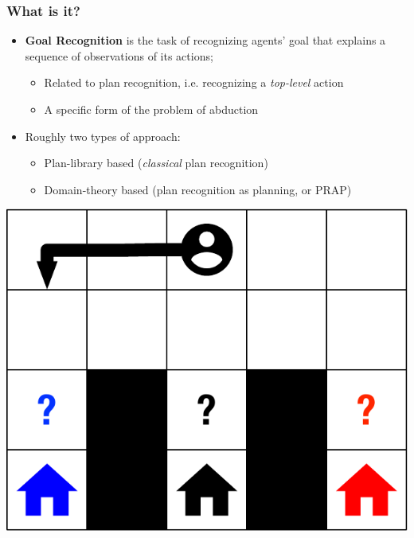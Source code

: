 \documentclass[usenames,dvipsnames]{beamer}
\begin{document}
	\begin{frame}[c]\frametitle{What is it?}
		\begin{itemize}
			\item \textbf{Goal Recognition} is the task of recognizing agents' goal that explains a sequence of observations of its actions;
			\begin{itemize}
				\item Related to plan recognition, i.e. recognizing a \emph{top-level} action
				\item A specific form of the problem of abduction 
			\end{itemize}
			\item Roughly two types of approach:
			\begin{itemize}
				\item Plan-library based (\emph{classical} plan recognition)
				\item Domain-theory based (plan recognition as planning, or PRAP)
			\end{itemize}
		\end{itemize}
		\begin{center}
			\includegraphics[width=.4\textwidth]{fig/gr-approaches/gr-concept.pdf}
		\end{center}
	\end{frame}
\end{document}
